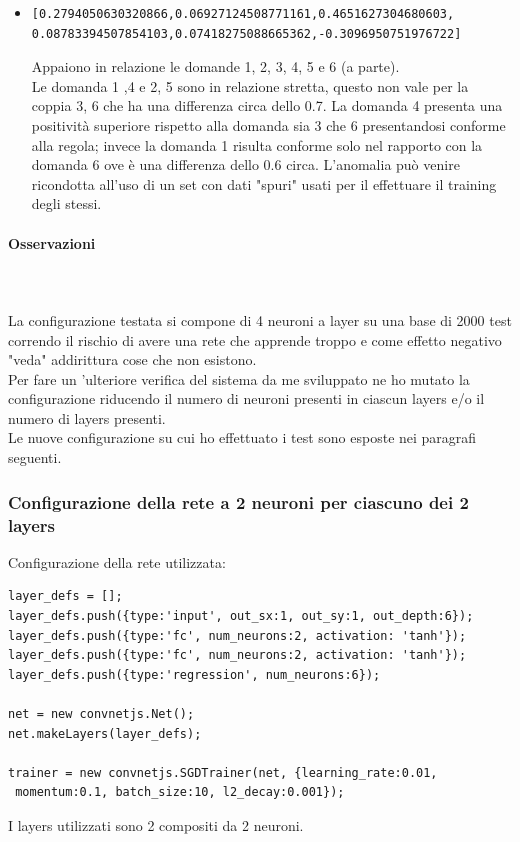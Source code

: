 \begin{itemize}
\item  \begin{verbatim}[0.2794050630320866,0.06927124508771161,0.4651627304680603,
0.08783394507854103,0.07418275088665362,-0.3096950751976722]\end{verbatim}
Appaiono in relazione le domande 1, 2, 3, 4, 5  e 6 (a parte).\\
Le domanda 1 ,4 e 2, 5  sono in relazione stretta, questo non vale per la coppia 3, 6 che ha una differenza circa dello 0.7. La domanda 4 presenta una positivit\`a superiore rispetto alla domanda sia 3 che 6 presentandosi conforme alla regola; invece la domanda 1 risulta conforme solo nel rapporto con la domanda 6 ove \`e una differenza dello 0.6 circa. L'anomalia pu\`o venire ricondotta all'uso di un set con dati "spuri" usati per il effettuare il training degli stessi.
\end{itemize}

\paragraph{Osservazioni}\mbox{}
\label{Osservazioni su rete a 4 neuroni per ciascuno dei 2 layers}
\\\\
\noindent
La configurazione testata si compone di 4 neuroni a layer su una base di 2000 test correndo il rischio di avere una rete che apprende troppo e come effetto negativo "veda" addirittura cose che non esistono.\\
Per fare un 'ulteriore verifica del sistema da me sviluppato ne ho mutato la configurazione riducendo il numero di neuroni presenti in ciascun layers e/o il numero di layers presenti.\\
Le nuove configurazione su cui ho effettuato i test sono esposte nei paragrafi seguenti.

\subsubsection{Configurazione della rete a 2 neuroni per ciascuno dei 2 layers}
\label{Configurazione della rete a 2 neuroni per ciascuno dei 2 layers}
Configurazione della rete utilizzata:\\
\begin{verbatim}layer_defs = [];
layer_defs.push({type:'input', out_sx:1, out_sy:1, out_depth:6});
layer_defs.push({type:'fc', num_neurons:2, activation: 'tanh'});
layer_defs.push({type:'fc', num_neurons:2, activation: 'tanh'});
layer_defs.push({type:'regression', num_neurons:6});

net = new convnetjs.Net();
net.makeLayers(layer_defs);

trainer = new convnetjs.SGDTrainer(net, {learning_rate:0.01,
 momentum:0.1, batch_size:10, l2_decay:0.001});
\end{verbatim}
\noindent
I layers utilizzati sono 2 compositi da 2 neuroni.

